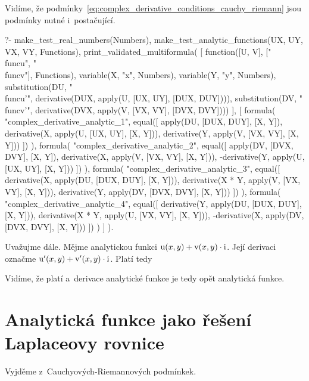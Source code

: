 Vidíme, že podmínky~\eqref{eq:complex_derivative_conditions_cauchy_riemann} jsou podmínky nutné i~postačující.

\begin{prolog}
?-	make_test_real_numbers(Numbers),
	make_test_analytic_functions(UX, UY, VX, VY, Functions),
	print_validated_multiformula(
		[
			function([U, V], ["\\func{u}", "\\func{v}"], Functions), 
			variable(X, "x", Numbers),
			variable(Y, "y", Numbers),
			substitution(DU, "\\func{u'}", derivative(DUX, apply(U, [UX, UY], [DUX, DUY]))),
			substitution(DV, "\\func{v'}", derivative(DVX, apply(V, [VX, VY], [DVX, DVY])))
		],
		[
			formula(
				"complex_derivative_analytic_1",
				equal([
					apply(DU, [DUX, DUY], [X, Y]),
					derivative(X, apply(U, [UX, UY], [X, Y])),
					derivative(Y, apply(V, [VX, VY], [X, Y]))
				])
			),
			formula(
				"complex_derivative_analytic_2",
				equal([
					apply(DV, [DVX, DVY], [X, Y]),
					derivative(X, apply(V, [VX, VY], [X, Y])),
					-derivative(Y, apply(U, [UX, UY], [X, Y]))
				])
			),
			formula(
				"complex_derivative_analytic_3",
				equal([
					derivative(X, apply(DU, [DUX, DUY], [X, Y])),
					derivative(X * Y, apply(V, [VX, VY], [X, Y])),
					derivative(Y, apply(DV, [DVX, DVY], [X, Y]))	
				])
			),
			formula(
				"complex_derivative_analytic_4",
				equal([
					derivative(Y, apply(DU, [DUX, DUY], [X, Y])),
					derivative(X * Y, apply(U, [VX, VY], [X, Y])),
					-derivative(X, apply(DV, [DVX, DVY], [X, Y]))	
				])
			)
		]
	).
\end{prolog}

Uvažujme dále. Mějme analytickou funkci \(\mathrm{u}(x, y) + \mathrm{v}(x, y) \cdot \mathrm{i}\). Její derivaci označme \(\mathrm{u'}(x, y) + \mathrm{v'}(x, y) \cdot \mathrm{i}\). Platí tedy

Vidíme, že platí
a~derivace analytické funkce je tedy opět analytická funkce.

\section{Analytická funkce jako řešení Laplaceovy rovnice}
\label{sec:complex_analytical_laplace}

Vyjděme z~Cauchyových-Riemannových podmínkek.

